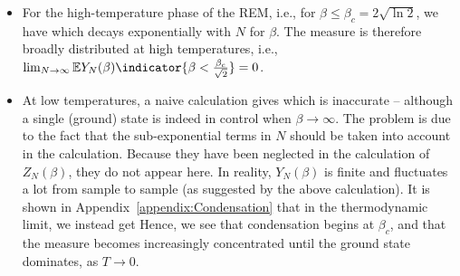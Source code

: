 \documentclass[letterpaper,english,10pt]{article}
\begin{document}
\begin{itemize}
\item For the high-temperature phase of the REM, i.e., for $\beta \le \beta_c = 2\sqrt{\ln2}$, we have
which decays exponentially with $N$ for $\beta $. 
The measure is therefore broadly distributed at high temperatures, i.e., $\lim_{N \to \infty}\E Y_N(\beta)\indicator{\beta  < \frac{\beta_c}{\sqrt{2}}} = 0$. 
 
 \item At low temperatures, a naive calculation gives
which is inaccurate -- although a single (ground) state is indeed in control when $\beta \to \infty$. 
The problem is due to the fact that the sub-exponential terms in $N$ should be taken into account in the calculation. 
Because they have been neglected in the calculation of $Z_N(\beta)$, they do not appear here. 
In reality, $Y_N (\beta)$ is finite and fluctuates a lot from sample to sample (as suggested by the above calculation). 
It is shown in Appendix~\ref{appendix:Condensation} that in the thermodynamic limit, we instead get
Hence, we see that condensation begins at $\beta_c$, and that the measure becomes increasingly concentrated until the ground state dominates, as $T \to 0$.  
\end{itemize}
\end{document}
